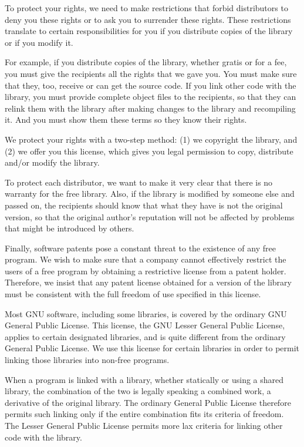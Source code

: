 To protect your rights, we need to make restrictions that forbid
distributors to deny you these rights or to ask you to surrender these
rights.  These restrictions translate to certain responsibilities for
you if you distribute copies of the library or if you modify it.

For example, if you distribute copies of the library, whether gratis
or for a fee, you must give the recipients all the rights that we gave
you.  You must make sure that they, too, receive or can get the source
code.  If you link other code with the library, you must provide
complete object files to the recipients, so that they can relink them
with the library after making changes to the library and recompiling
it.  And you must show them these terms so they know their rights.

We protect your rights with a two-step method: (1) we copyright the
library, and (2) we offer you this license, which gives you legal
permission to copy, distribute and/or modify the library.

To protect each distributor, we want to make it very clear that there
is no warranty for the free library.  Also, if the library is modified
by someone else and passed on, the recipients should know that what
they have is not the original version, so that the original author's
reputation will not be affected by problems that might be introduced
by others.


Finally, software patents pose a constant threat to the existence of
any free program.  We wish to make sure that a company cannot
effectively restrict the users of a free program by obtaining a
restrictive license from a patent holder.  Therefore, we insist that
any patent license obtained for a version of the library must be
consistent with the full freedom of use specified in this license.

  Most GNU software, including some libraries, is covered by the
ordinary GNU General Public License.  This license, the GNU Lesser
General Public License, applies to certain designated libraries, and
is quite different from the ordinary General Public License.  We use
this license for certain libraries in order to permit linking those
libraries into non-free programs.

When a program is linked with a library, whether statically or using a
shared library, the combination of the two is legally speaking a
combined work, a derivative of the original library.  The ordinary
General Public License therefore permits such linking only if the
entire combination fits its criteria of freedom.  The Lesser General
Public License permits more lax criteria for linking other code with
the library.

